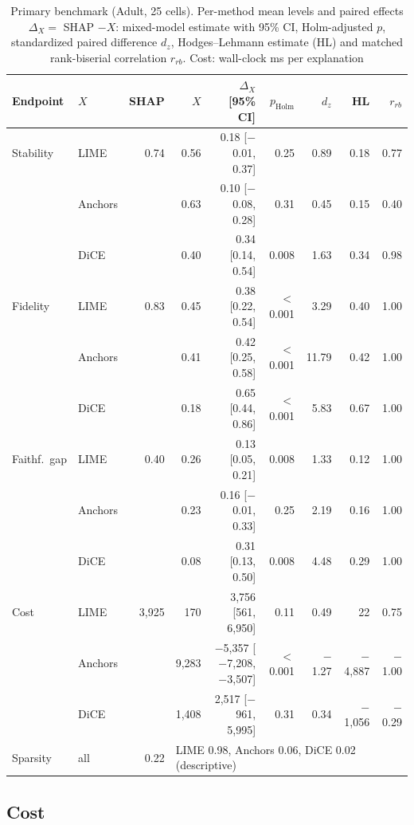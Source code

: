 \documentclass[11pt,a4paper]{article}
\begin{document}
\begin{table}[htb]
\centering
\caption{Primary benchmark (Adult, 25 cells). Per-method mean levels and
paired effects $\Delta_X = $ SHAP $- X$: mixed-model estimate with 95\% CI,
Holm-adjusted $p$, standardized paired difference $d_z$, Hodges--Lehmann
estimate (HL) and matched rank-biserial correlation $r_{rb}$. Cost: wall-clock
ms per explanation}
\label{tab:paired_main}
\begin{tabular}{llrrrrrrr}
\toprule
Endpoint & $X$ & SHAP & $X$ & $\Delta_X$ [95\% CI] & $p_{\mathrm{Holm}}$ & $d_z$ & HL & $r_{rb}$ \\
\midrule
Stability & LIME & 0.74 & 0.56 & 0.18 [$-$0.01, 0.37] & 0.25 & 0.89 & 0.18 & 0.77 \\
 & Anchors & & 0.63 & 0.10 [$-$0.08, 0.28] & 0.31 & 0.45 & 0.15 & 0.40 \\
 & DiCE & & 0.40 & 0.34 [0.14, 0.54] & 0.008 & 1.63 & 0.34 & 0.98 \\
Fidelity & LIME & 0.83 & 0.45 & 0.38 [0.22, 0.54] & $<$0.001 & 3.29 & 0.40 & 1.00 \\
 & Anchors & & 0.41 & 0.42 [0.25, 0.58] & $<$0.001 & 11.79 & 0.42 & 1.00 \\
 & DiCE & & 0.18 & 0.65 [0.44, 0.86] & $<$0.001 & 5.83 & 0.67 & 1.00 \\
Faithf.\ gap & LIME & 0.40 & 0.26 & 0.13 [0.05, 0.21] & 0.008 & 1.33 & 0.12 & 1.00 \\
 & Anchors & & 0.23 & 0.16 [$-$0.01, 0.33] & 0.25 & 2.19 & 0.16 & 1.00 \\
 & DiCE & & 0.08 & 0.31 [0.13, 0.50] & 0.008 & 4.48 & 0.29 & 1.00 \\
Cost & LIME & 3,925 & 170 & 3,756 [561, 6,950] & 0.11 & 0.49 & 22 & 0.75 \\
 & Anchors & & 9,283 & $-$5,357 [$-$7,208, $-$3,507] & $<$0.001 & $-$1.27 & $-$4,887 & $-$1.00 \\
 & DiCE & & 1,408 & 2,517 [$-$961, 5,995] & 0.31 & 0.34 & $-$1,056 & $-$0.29 \\
\midrule
Sparsity & all & 0.22 & \multicolumn{6}{l}{LIME 0.98, Anchors 0.06, DiCE 0.02 (descriptive)} \\
\bottomrule
\end{tabular}
\end{table}

\subsection{Cost}
\label{sec:cost}
\end{document}
